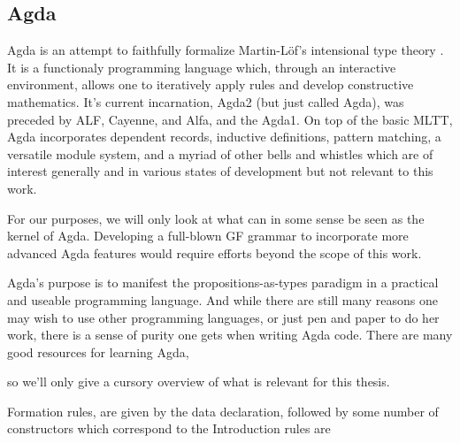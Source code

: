 \subsection{Agda}

Agda is an attempt to faithfully formalize Martin-Löf's intensional type theory
\cite{ml1984}. It is a functionaly programming language which, through an
interactive environment, allows one to iteratively apply rules and develop
constructive mathematics. It's current incarnation, Agda2 (but just called
Agda), was preceded by ALF, Cayenne, and Alfa, and the Agda1. On top of the
basic MLTT, Agda incorporates dependent records, inductive definitions, pattern
matching, a versatile module system, and a myriad of other bells and whistles
which are of interest generally and in various states of development but not
relevant to this work.

For our purposes, we will only look at what can in some sense be seen as the
kernel of Agda. Developing a full-blown GF grammar to incorporate more
advanced Agda features would require efforts beyond the scope of this work.

Agda's purpose is to manifest the propositions-as-types paradigm in a practical
and useable programming language. And while there are still many reasons one may
wish to use other programming languages, or just pen and paper to do her work,
there is a sense of purity one gets when writing Agda code. There are many good
resources for learning Agda,
  



so we'll only give a cursory overview of what is relevant for this thesis.


% 

Formation rules, are given by the data declaration, followed by some number of
constructors which correspond to the 
Introduction rules are 


